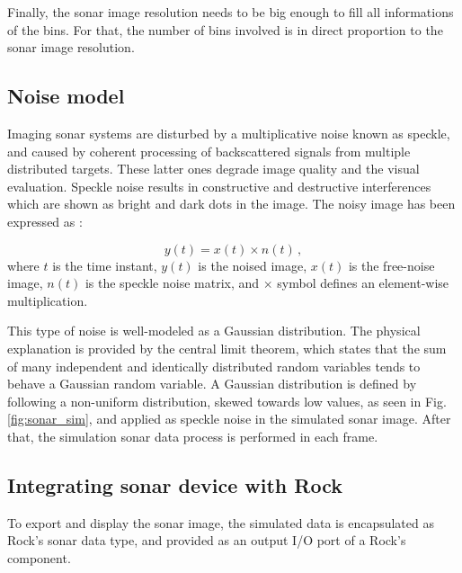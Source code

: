 \documentclass[final,5p,times]{elsarticle}
\begin{document}
Finally, the sonar image resolution needs to be big enough to fill all
informations of the bins. For that, the number of bins involved is in direct
proportion to the sonar image resolution.


\subsection{Noise model}
\label{dev:noise}

Imaging sonar systems are disturbed by a multiplicative noise known as speckle,
and caused by coherent processing of backscattered signals from multiple
distributed targets. These latter ones degrade image quality and the visual
evaluation. Speckle noise results in constructive and destructive interferences
which are shown as bright and dark dots in the image. The noisy image has been
expressed as \cite{lee1980}:

\begin{equation}
\label{eq:2}
y(t) = x(t) \times n(t) \, ,
\end{equation}
where $t$ is the time instant, $y(t)$ is the noised image, $x(t)$ is the
free-noise image, $n(t)$ is the speckle noise matrix, and $\times$ symbol defines an
element-wise multiplication.

This type of noise is well-modeled as a Gaussian distribution. The physical
explanation is provided by the central limit theorem, which states that the
sum of many independent and identically distributed random variables tends
to behave a Gaussian random variable. A Gaussian distribution is defined
by following a non-uniform distribution, skewed towards low values, as seen
in Fig. \ref{fig:sonar_sim}, and applied as speckle noise in the simulated
sonar image. After that, the simulation sonar data process is performed in
each frame.

\subsection{Integrating sonar device with Rock}
\label{dev:rock}

To export and display the sonar image, the simulated data is encapsulated
as Rock's sonar data type, and provided as an output I/O port of a Rock's
component.

\end{document}

